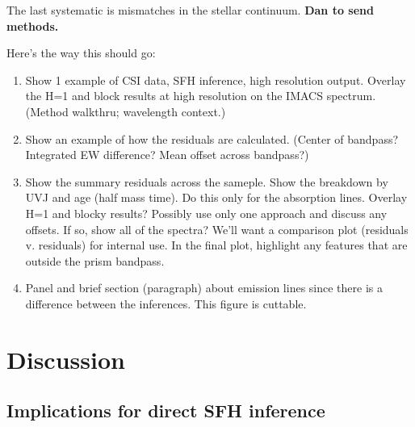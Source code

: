 \documentclass[a4paper,fleqn,usenatbib]{mnras}
\newcommand{\bfr}{\bf\color{red}}
\newcommand{\benum}{\begin{enumerate}}
\newcommand{\eenum}{\end{enumerate}}
\begin{document}
The last systematic is mismatches in the stellar continuum. {\bfr Dan to send methods.}

Here's the way this should go:
\benum
	\item Show 1 example of CSI data, SFH inference, high resolution output. Overlay the H=1 and block
		results at high resolution on the IMACS spectrum. (Method walkthru; wavelength context.)
	\item Show an example of how the residuals are calculated. (Center of bandpass? Integrated EW
		difference? Mean offset across bandpass?)
	\item Show the summary residuals across the sameple. Show the breakdown by UVJ and age 
		(half mass time). 	Do this only for the absorption lines. Overlay H=1 and blocky results? Possibly use
		only one approach and discuss any offsets. If so, show all of the spectra? We'll want a comparison 
		plot (residuals v. residuals) for internal use. In the final plot, highlight any features that are 
		outside the 	prism bandpass.
	\item Panel and brief section (paragraph) about emission lines since there is a difference between
		the inferences. This figure is cuttable.
\eenum
\fi


\section{Discussion}
\label{sec:discussion}



\subsection{Implications for direct SFH inference}
\label{sec:sedMap}
\end{document}
